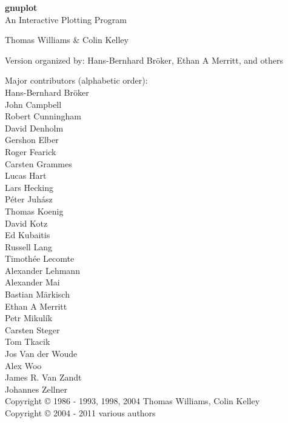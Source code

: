 \documentclass[twoside]{article}
\def\gnuplotVersion{\usebox\GpVersion}
\begin{document}
\sloppy
\thispagestyle{empty}
\rule{0in}{1.0in}

  \begin{center}

  {\huge\bf {gnuplot \gpVersion}}\\
  \vspace{3ex}
  {\Large An Interactive Plotting Program}\\

  \vspace{2ex}

  \large
  Thomas Williams \& Colin Kelley\\

  \vspace{2ex}

  Version
    \gnuplotVersion
  organized by: Hans-Bernhard Bröker, Ethan A Merritt, and others\\

   \vspace{2ex}

  Major contributors (alphabetic order):\\

  Hans-Bernhard Bröker \\
  John Campbell\\
  Robert Cunningham\\
  David Denholm\\
  Gershon Elber\\
  Roger Fearick\\
  Carsten Grammes\\
  Lucas Hart \\
  Lars Hecking \\
  Péter Juhász \\
  Thomas Koenig\\
  David Kotz\\
  Ed Kubaitis\\
  Russell Lang\\
  Timothée Lecomte\\
  Alexander Lehmann\\
  Alexander Mai \\
  Bastian Märkisch \\
  Ethan A Merritt \\
  Petr Mikulík\\
  Carsten Steger\\
  Tom Tkacik\\
  Jos Van der Woude\\
  Alex Woo\\
  James R. Van Zandt\\
  Johannes Zellner\\
  Copyright {\copyright} 1986 - 1993, 1998, 2004   Thomas Williams, Colin Kelley\\
  Copyright {\copyright} 2004 - 2011  various authors\\


\end{center}
\end{document}
